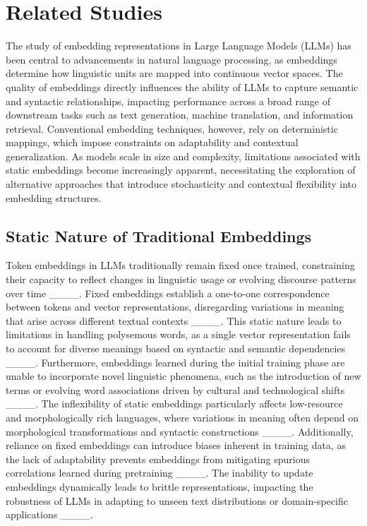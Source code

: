 \section{Related Studies}
The study of embedding representations in Large Language Models (LLMs) has been central to advancements in natural language processing, as embeddings determine how linguistic units are mapped into continuous vector spaces. The quality of embeddings directly influences the ability of LLMs to capture semantic and syntactic relationships, impacting performance across a broad range of downstream tasks such as text generation, machine translation, and information retrieval. Conventional embedding techniques, however, rely on deterministic mappings, which impose constraints on adaptability and contextual generalization. As models scale in size and complexity, limitations associated with static embeddings become increasingly apparent, necessitating the exploration of alternative approaches that introduce stochasticity and contextual flexibility into embedding structures. 

\subsection{Static Nature of Traditional Embeddings}

Token embeddings in LLMs traditionally remain fixed once trained, constraining their capacity to reflect changes in linguistic usage or evolving discourse patterns over time ____. Fixed embeddings establish a one-to-one correspondence between tokens and vector representations, disregarding variations in meaning that arise across different textual contexts ____. This static nature leads to limitations in handling polysemous words, as a single vector representation fails to account for diverse meanings based on syntactic and semantic dependencies ____. Furthermore, embeddings learned during the initial training phase are unable to incorporate novel linguistic phenomena, such as the introduction of new terms or evolving word associations driven by cultural and technological shifts ____. The inflexibility of static embeddings particularly affects low-resource and morphologically rich languages, where variations in meaning often depend on morphological transformations and syntactic constructions ____. Additionally, reliance on fixed embeddings can introduce biases inherent in training data, as the lack of adaptability prevents embeddings from mitigating spurious correlations learned during pretraining ____. The inability to update embeddings dynamically leads to brittle representations, impacting the robustness of LLMs in adapting to unseen text distributions or domain-specific applications ____. 

